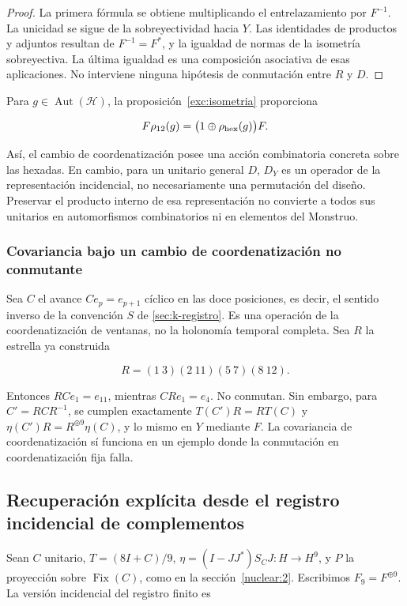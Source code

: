 \begin{proof}
La primera fórmula se obtiene multiplicando el entrelazamiento por \(F^{-1}\). La unicidad se sigue de la sobreyectividad hacia \(Y\). Las identidades de productos y adjuntos resultan de \(F^{-1}=F^*\), y la igualdad de normas de la isometría sobreyectiva. La última igualdad es una composición asociativa de esas aplicaciones. No interviene ninguna hipótesis de conmutación entre \(R\) y \(D\).
\end{proof}

Para \(g\in\operatorname{Aut}(\mathcal H)\), la proposición~\ref{exc:isometria} proporciona

\[
F\rho_{12}(g)=\bigl(1\oplus\rho_{\rm hex}(g)\bigr)F.
\]

Así, el cambio de coordenatización posee una acción combinatoria concreta sobre las hexadas. En cambio, para un unitario general \(D\), \(D_Y\) es un operador de la representación incidencial, no necesariamente una permutación del diseño. Preservar el producto interno de esa representación no convierte a todos sus unitarios en automorfismos combinatorios ni en elementos del Monstruo.

\subsubsection{Covariancia bajo un cambio de coordenatización no conmutante}

Sea \(C\) el avance \(Ce_p=e_{p+1}\) cíclico en las doce posiciones, es decir, el sentido inverso de la convención \(S\) de \cref{sec:k-registro}. Es una operación de la coordenatización de ventanas, no la holonomía temporal completa. Sea \(R\) la estrella ya construida

\[
R=(1\ 3)(2\ 11)(5\ 7)(8\ 12).
\]

Entonces \(RCe_1=e_{11}\), mientras \(CRe_1=e_4\). No conmutan. Sin embargo, para \(C'=RCR^{-1}\), se cumplen exactamente \(T(C')R=RT(C)\) y \(\eta(C')R=R^{\oplus9}\eta(C)\), y lo mismo en \(Y\) mediante \(F\). La covariancia de coordenatización sí funciona en un ejemplo donde la conmutación en coordenatización fija falla.

\subsection{Recuperación explícita desde el registro incidencial de complementos}\label{nuc05:recuperacion}

Sean \(C\) unitario, \(T=(8I+C)/9\), \(\eta=(I-JJ^*)S_CJ:H\to H^9\), y \(P\) la proyección sobre \(\operatorname{Fix}(C)\), como en la sección~\ref{nuclear:2}. Escribimos \(F_9=F^{\oplus9}\). La versión incidencial del registro finito es

